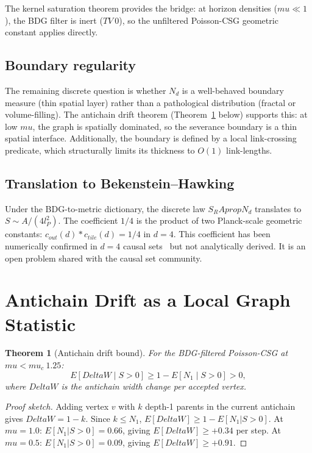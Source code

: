\documentclass[11pt]{article}
\def\Delta{Delta}%
\def\mu{mu}%
\def\mathrm#1{#1}%
\def\mathbb#1{#1}%
\def\cdot{*}%
\def\approx{~}%
\def\partial{d}%
\def\propto{prop}%
\def\SRa{S_RA}%
\def\TV{TV}%
\newtheorem{theorem}{Theorem}
\newcommand{\SRa}{S_{\mathrm{RA}}}
\newcommand{\TV}{\mathrm{TV}}
\begin{document}
The kernel saturation theorem provides the bridge: at horizon densities ($\mu\ll 1$), the BDG filter is inert ($\TV\approx 0$), so the unfiltered Poisson-CSG geometric constant applies directly.

\subsection{Boundary regularity}

The remaining discrete question is whether $N_\partial$ is a well-behaved boundary measure (thin spatial layer) rather than a pathological distribution (fractal or volume-filling). The antichain drift theorem (Theorem~\ref{thm:drift} below) supports this: at low $\mu$, the graph is spatially dominated, so the severance boundary is a thin spatial interface. Additionally, the boundary is defined by a local link-crossing predicate, which structurally limits its thickness to $O(1)$ link-lengths.

\subsection{Translation to Bekenstein--Hawking}

Under the BDG-to-metric dictionary, the discrete law $\SRa\propto N_\partial$ translates to $S\sim A/(4l_P^2)$. The coefficient $1/4$ is the product of two Planck-scale geometric constants: $c_{\mathrm{out}}(d)\cdot c_{\mathrm{tile}}(d)=1/4$ in $d=4$. This coefficient has been numerically confirmed in $d=4$ causal sets~\cite{Homsak2024} but not analytically derived. It is an open problem shared with the causal set community.

\section{Antichain Drift as a Local Graph Statistic}
\label{sec:drift}

\begin{theorem}[Antichain drift bound]
\label{thm:drift}
For the BDG-filtered Poisson-CSG at $\mu<\mu_c\approx 1.25$:
\begin{equation}
\mathbb{E}[\Delta W\mid S>0]\ge 1-\mathbb{E}[N_1\mid S>0]>0,
\end{equation}
where $\Delta W$ is the antichain width change per accepted vertex.
\end{theorem}
\begin{proof}[Proof sketch]
Adding vertex $v$ with $k$ depth-1 parents in the current antichain gives $\Delta W=1-k$. Since $k\le N_1$, $\mathbb{E}[\Delta W]\ge 1-\mathbb{E}[N_1|S>0]$. At $\mu=1.0$: $\mathbb{E}[N_1|S>0]=0.66$, giving $\mathbb{E}[\Delta W]\ge +0.34$ per step. At $\mu=0.5$: $\mathbb{E}[N_1|S>0]=0.09$, giving $\mathbb{E}[\Delta W]\ge +0.91$.
\end{proof}
\end{document}

